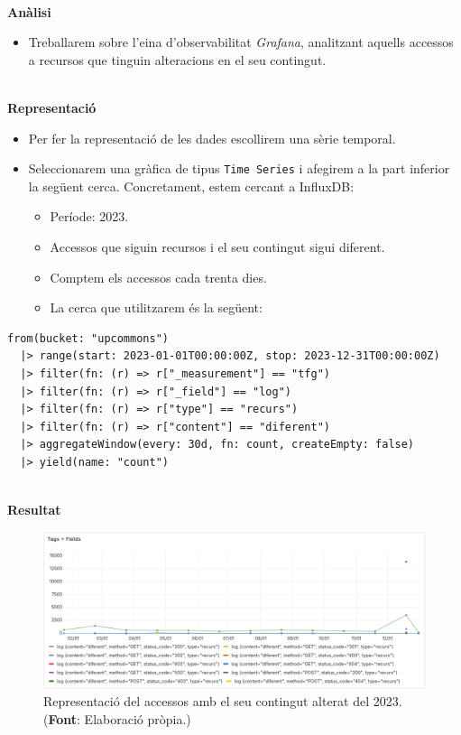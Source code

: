 \noindent \\
\textbf{Anàlisi}

\begin{itemize}
    \item Treballarem sobre l'eina d'observabilitat \textit{Grafana}, analitzant aquells accessos a recursos que tinguin alteracions en el seu contingut.
\end{itemize}

\noindent \\
\textbf{Representació}

\begin{itemize}
    \item Per fer la representació de les dades escollirem una sèrie temporal.
    \item Seleccionarem una gràfica de tipus \texttt{Time Series} i afegirem a la part inferior la següent cerca.
    Concretament, estem cercant a InfluxDB:

    \begin{itemize}
        \item Període: 2023.
        \item Accessos que siguin recursos i el seu contingut sigui diferent.
        \item Comptem els accessos cada trenta dies.
        \item La cerca que utilitzarem és la següent:
    \end{itemize}
\end{itemize}

\noindent
\begin{verbatim}
from(bucket: "upcommons")
  |> range(start: 2023-01-01T00:00:00Z, stop: 2023-12-31T00:00:00Z)
  |> filter(fn: (r) => r["_measurement"] == "tfg")
  |> filter(fn: (r) => r["_field"] == "log")
  |> filter(fn: (r) => r["type"] == "recurs")
  |> filter(fn: (r) => r["content"] == "diferent")
  |> aggregateWindow(every: 30d, fn: count, createEmpty: false)
  |> yield(name: "count")
\end{verbatim}

\clearpage

\noindent \\
\textbf{Resultat}

\begin{figure}[htbp]
    \centerline{\includegraphics[width=\textwidth]{figures/possible-attacks}}
    \captionsetup{justification=centering}
    \caption[Representació dels accessos amb el seu contingut alterat del 2023.]{Representació del accessos amb el seu contingut alterat del 2023. (\textbf{Font}: Elaboració pròpia.)}\label{fig:log-altered}
\end{figure}

